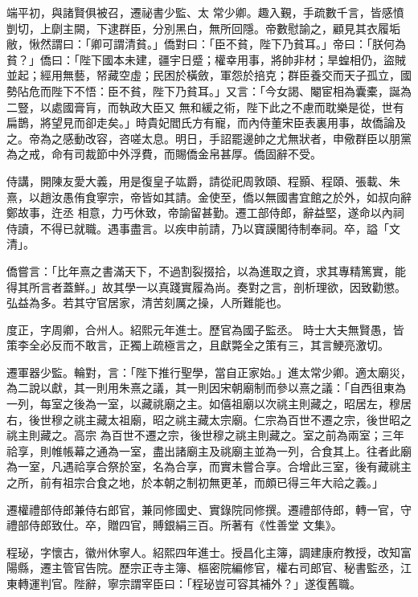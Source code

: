 \begin{pinyinscope}
 端平初，與諸賢俱被召，遷祕書少監、太
 常少卿。趣入覲，手疏數千言，皆感憤剴切，上劘主闕，下逮群臣，分別黑白，無所回隱。帝數慰諭之，顧見其衣履垢敝，愀然謂曰：「卿可謂清貧。」僑對曰：「臣不貧，陛下乃貧耳。」帝曰：「朕何為貧？」僑曰：「陛下國本未建，疆宇日蹙；權幸用事，將帥非材；旱蝗相仍，盜賊並起；經用無藝，帑藏空虛；民困於橫斂，軍怨於掊克；群臣養交而天子孤立，國勢阽危而陛下不悟：臣不貧，陛下乃貧耳。」又言：「今女謁、閹宦相為囊橐，誕為二豎，以處國膏肓，而執政大臣又
 無和緩之術，陛下此之不慮而耽樂是從，世有扁鵲，將望見而卻走矣。」時貴妃閻氏方有寵，而內侍董宋臣表裏用事，故僑論及之。帝為之感動改容，咨嗟太息。明日，手詔罷邊帥之尤無狀者，申儆群臣以朋黨為之戒，命有司裁節中外浮費，而賜僑金帛甚厚。僑固辭不受。



 侍講，開陳友愛大義，用是復皇子竑爵，請從祀周敦頤、程顥、程頤、張載、朱熹，以趙汝愚侑食寧宗，帝皆如其請。金使至，僑以無國書宜館之於外，如叔向辭鄭故事，迕丞
 相意，力丐休致，帝諭留甚勤。遷工部侍郎，辭益堅，遂命以內祠侍讀，不得已就職。遇事盡言。以疾申前請，乃以寶謨閣待制奉祠。卒，謚「文清」。



 僑嘗言：「比年熹之書滿天下，不過割裂掇拾，以為進取之資，求其專精篤實，能得其所言者蓋鮮。」故其學一以真踐實履為尚。奏對之言，剖析理欲，因致勸懲。弘益為多。若其守官居家，清苦刻厲之操，人所難能也。



 度正，字周卿，合州人。紹熙元年進士。歷官為國子監丞。
 時士大夫無賢愚，皆策李全必反而不敢言，正獨上疏極言之，且獻斃全之策有三，其言鯁亮激切。



 遷軍器少監。輪對，言：「陛下推行聖學，當自正家始。」進太常少卿。適太廟災，為二說以獻，其一則用朱熹之議，其一則因宋朝廟制而參以熹之議：「自西徂東為一列，每室之後為一室，以藏祧廟之主。如僖祖廟以次祧主則藏之，昭居左，穆居右，後世穆之祧主藏太祖廟，昭之祧主藏太宗廟。仁宗為百世不遷之宗，後世昭之祧主則藏之。高宗
 為百世不遷之宗，後世穆之祧主則藏之。室之前為兩室；三年祫享，則帷帳幕之通為一室，盡出諸廟主及祧廟主並為一列，合食其上。往者此廟為一室，凡遇祫享合祭於室，名為合享，而實未嘗合享。合增此三室，後有藏祧主之所，前有祖宗合食之地，於本朝之制初無更革，而頗已得三年大祫之義。」



 遷權禮部侍郎兼侍右郎官，兼同修國史、實錄院同修撰。遷禮部侍郎，轉一官，守禮部侍郎致仕。卒，贈四官，賻銀絹三百。所著有《性善堂
 文集》。



 程珌，字懷古，徽州休寧人。紹熙四年進士。授昌化主簿，調建康府教授，改知富陽縣，遷主管官告院。歷宗正寺主簿、樞密院編修官，權右司郎官、秘書監丞，江東轉運判官。陛辭，寧宗謂宰臣曰：「程珌豈可容其補外？」遂復舊職。




\end{pinyinscope}
